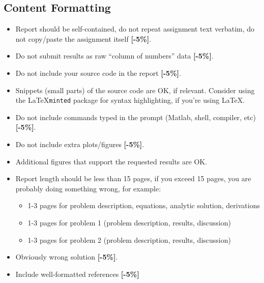 \documentclass{article}
\begin{document}
                \subsection{Content Formatting}
        \begin{itemize}
        \item    Report should be self-contained, do not repeat assignment text 
                verbatim, do not copy/paste the assignment itself  {\color{red}\textbf{[-5\%]}}.
        \item    Do not submit results as raw ``column of numbers'' data  {\color{red}\textbf{[-5\%]}}.
        \item    Do not include your source code in the report  {\color{red}\textbf{[-5\%]}}.
        \item    Snippets (small parts) of the source code are OK, if relevant. 
                Consider using the \LaTeX \texttt{minted} package for syntax highlighting, if 
                you're using \LaTeX.
        \item    Do not include commands typed in the prompt (Matlab, shell, compiler, etc) 
                 {\color{red}\textbf{[-5\%]}}.
        \item    Do not include extra plots/figures  {\color{red}\textbf{[-5\%]}}.
        \item    Additional figures that support the requested results are OK.
        \item   Report length should be less than 15 pages, if you exceed 15 pages, 
                you are probably doing something wrong, for example:
                \begin{itemize}
                        \item  1-3 pages for problem description, equations, analytic solution, derivations
                        \item  1-3 pages for problem 1 (problem description, results, discussion)
                        \item  1-3 pages for problem 2 (problem description, results, discussion)
                \end{itemize}
        \item    Obviously wrong solution  {\color{red}\textbf{[-5\%]}}.
        \item    Include well-formatted references  {\color{red}\textbf{[-5\%]}} 
\end{itemize}
\end{document}

